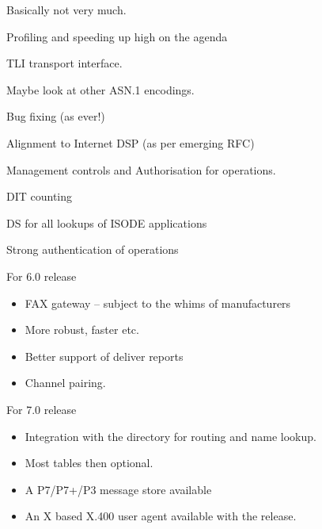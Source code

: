\begin{bwslide}
\begin{nrtc}
\item	Basically not very much.
\item	Profiling and speeding up high on the agenda
\item	TLI transport interface.
\item	Maybe look at other ASN.1 encodings.
\item	Bug fixing (as ever!)
\end{nrtc}
\end{bwslide}

\begin{bwslide}
\begin{nrtc}
\item	Alignment to Internet DSP (as per emerging RFC)
\item	Management controls and Authorisation for operations.
\item	DIT counting
\item	DS for all lookups of ISODE applications
\item	Strong authentication of operations 
\end{nrtc}
\end{bwslide}

\begin{bwslide}
\begin{nrtc}
\item	For 6.0 release
	\begin{itemize}
	\item	FAX gateway -- subject to the whims of manufacturers
	\item	More robust, faster etc.
	\item	Better support of deliver reports
	\item	Channel pairing.
	\end{itemize}
\item	For 7.0 release
	\begin{itemize}
	\item	Integration with the directory for routing and name
lookup.
	\item	Most tables then optional.
	\item	A P7/P7+/P3 message store available
	\item	An X based X.400 user agent available with the release.
	\end{itemize}
\end{nrtc}
\end{bwslide}

